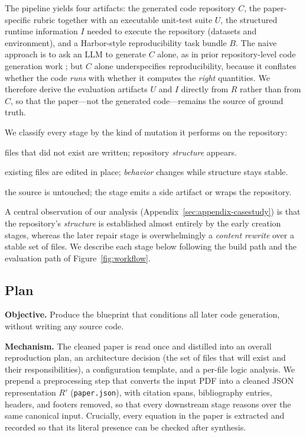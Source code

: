 \documentclass[11pt]{article}
\begin{document}
\label{sec:method-stages}
The pipeline yields four artifacts: the generated code repository $C$, the paper-specific rubric together with an executable unit-test suite $U$, the structured runtime information $I$ needed to execute the repository (datasets and environment), and a Harbor-style reproducibility task bundle $B$. The naive approach is to ask an LLM to generate $C$ alone, as in prior repository-level code generation work \citep{seo2025papercoder}; but $C$ alone underspecifies reproducibility, because it conflates whether the code \emph{runs} with whether it computes the \emph{right} quantities. We therefore derive the evaluation artifacts $U$ and $I$ directly from $R$ rather than from $C$, so that the paper---not the generated code---remains the source of ground truth.

We classify every stage by the kind of mutation it performs on the repository:
\begin{description}[leftmargin=1em,itemsep=1pt,topsep=2pt]
  \item[\textbf{Create}] files that did not exist are written; repository \emph{structure} appears.
  \item[\textbf{Rewrite}] existing files are edited in place; \emph{behavior} changes while structure stays stable.
  \item[\textbf{Package/Spec}] the source is untouched; the stage emits a side artifact or wraps the repository.
\end{description}
A central observation of our analysis (Appendix~\ref{sec:appendix-casestudy}) is that the repository's \emph{structure} is established almost entirely by the early creation stages, whereas the later repair stage is overwhelmingly a \emph{content rewrite} over a stable set of files. We describe each stage below following the build path and the evaluation path of Figure~\ref{fig:workflow}.

\subsection{Plan}

\textbf{Objective.} Produce the blueprint that conditions all later code generation, without writing any source code.

\textbf{Mechanism.} The cleaned paper is read once and distilled into an overall reproduction plan, an architecture decision (the set of files that will exist and their responsibilities), a configuration template, and a per-file logic analysis. We prepend a preprocessing step that converts the input PDF into a cleaned JSON representation $R'$ (\texttt{paper.json}), with citation spans, bibliography entries, headers, and footers removed, so that every downstream stage reasons over the same canonical input. Crucially, every equation in the paper is extracted and recorded so that its literal presence can be checked after synthesis.
\end{document}
